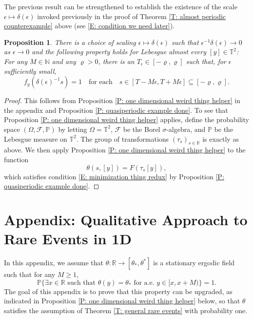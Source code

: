 \documentclass[12pt]{amsart}
\newtheorem{prop}{Proposition}
\begin{document}
The previous result can be strengthened to establish the existence of the scale $\epsilon \mapsto \delta(\epsilon)$ invoked previously in the proof of Theorem \ref{T: almost periodic counterexample} above (see \eqref{E: condition we need later}). 

\begin{prop} \label{P: quasiperiodic example done done} There is a choice of scaling $\epsilon \mapsto \delta(\epsilon)$ such that $\epsilon^{-1} \delta(\epsilon) \to 0$ as $\epsilon \to 0$ and the following property holds for Lebesgue almost every $[y] \in \mathbb{T}^{2}$: For any $M \in \mathbb{N}$ and any $\varrho > 0$, there is an $T_{\epsilon} \in [-\varrho,\varrho]$ such that, for $\epsilon$ sufficiently small,
	\begin{equation*}
		f_{y}(\delta(\epsilon)^{-1} s) = 1 \quad \text{for each} \quad s \in [T - M \epsilon, T + M \epsilon] \subseteq [-\varrho, \varrho].
	\end{equation*}
\end{prop}

\begin{proof} This follows from Proposition \ref{P: one dimensional weird thing helper} in the appendix and Proposition \ref{P: quasiperiodic example done}. To see that Proposition \ref{P: one dimensional weird thing helper} applies, define the probability space $(\Omega,\mathcal{F},\mathbb{P})$ by letting $\Omega = \mathbb{T}^{2}$, $\mathcal{F}$ be the Borel $\sigma$-algebra, and $\mathbb{P}$ be the Lebesgue measure on $\mathbb{T}^{2}$.  The group of transformations $(\tau_{s})_{s \in \mathbb{R}}$ is exactly as above.  We then apply Proposition \ref{P: one dimensional weird thing helper} to the function 
		\begin{equation*}
			\theta(s,[y]) = F(\tau_{s}[y]),
		\end{equation*}
	which satisfies condition \eqref{E: minimization thing redux} by Proposition \ref{P: quasiperiodic example done}. \end{proof}

\section*{Appendix: Qualitative Approach to Rare Events in 1D} \label{A: one dimensional weird thing}

In this appendix, we assume that $\theta : \mathbb{R} \to [\theta_{*},\theta^{*}]$ is a stationary ergodic field such that for any $M \geq 1$, 
	\begin{equation} \label{E: minimization thing redux}
		\mathbb{P}\{\exists x \in \mathbb{R} \, \, \text{such that} \, \, \theta(y) = \theta_{*} \, \, \text{for a.e.} \, \, y \in [x, x + M)\} = 1.
	\end{equation}
The goal of this appendix is to prove that this property can be upgraded, as indicated in Proposition \ref{P: one dimensional weird thing helper} below, so that $\theta$ satisfies the assumption of Theorem \ref{T: general rare events} with probability one.
\end{document}
